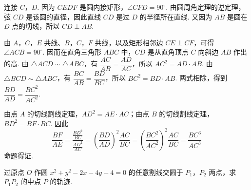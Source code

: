 \documentclass[UTF8,a4paper,oneside,11pt]{ctexbook}
\begin{document}
\begin{solution}
连接 \(C\)，\(D\). 因为 \(CEDF\) 是圆内接矩形，\(\angle CFD=90^\circ\). 由圆周角定理的逆定理，弦 \(CD\) 是该圆的直径，因此直线 \(CD\) 是过 \(D\) 的半径所在直线. 又因为 \(AB\) 是圆在 \(D\) 点的切线，所以 \(CD\perp AB\).

由 \(A\)，\(C\)，\(E\) 共线、\(B\)，\(C\)，\(F\) 共线，以及矩形相邻边 \(CE\perp CF\)，可得 \(\angle ACB=90^\circ\). 因而在直角三角形 \(ABC\) 中，\(CD\) 是从直角顶点 \(C\) 向斜边 \(AB\) 作出的高. 由 \(\triangle ACD\sim\triangle ABC\)，有 \(\dfrac{AC}{AB}=\dfrac{AD}{AC}\)，所以 \(AC^2=AD\cdot AB\). 由 \(\triangle BCD\sim\triangle ABC\)，有 \(\dfrac{BC}{AB}=\dfrac{BD}{BC}\)，所以 \(BC^2=BD\cdot AB\). 两式相除，得到 \(\dfrac{BD}{AD}=\dfrac{BC^2}{AC^2}\).

由点 \(A\) 的切线割线定理，\(AD^2=AE\cdot AC\)；由点 \(B\) 的切线割线定理，\(BD^2=BF\cdot BC\). 因此
\[
\frac{BF}{AE}=\frac{\frac{BD^2}{BC}}{\frac{AD^2}{AC}}=\left(\frac{BD}{AD}\right)^2\frac{AC}{BC}=\left(\frac{BC^2}{AC^2}\right)^2\frac{AC}{BC}=\frac{BC^3}{AC^3}
\]
命题得证.
\end{solution}

\begin{problem}
过原点 \(O\) 作圆 \(x^{2} + y^{2} - 2x - 4y + 4 = 0\) 的任意割线交圆于 \(P_{1}\)，\(P_{2}\) 两点，求 \(P_{1}P_{2}\) 的中点 \(P\) 的轨迹.
\end{problem}
\end{document}
